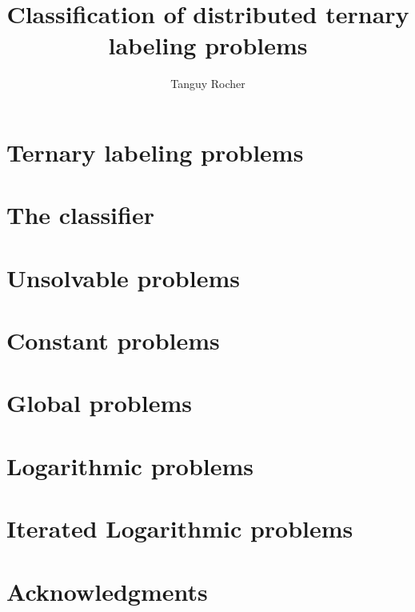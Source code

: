 
\title{Classification of distributed ternary labeling problems}
\author{Tanguy Rocher}



\maketitle

\tableofcontents
\newpage
\chapter{Ternary labeling problems}


\newpage
\chapter{The classifier}


\newpage
\chapter{Unsolvable problems}


\newpage
\chapter{Constant problems}


\newpage
\chapter{Global problems}



\newpage
\chapter{Logarithmic problems}


\newpage
\chapter{Iterated Logarithmic problems}


\chapter{Acknowledgments}




